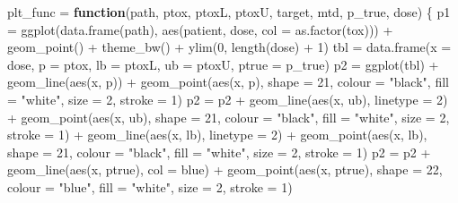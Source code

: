 \documentclass[
]{article}
\newenvironment{Shaded}{\begin{snugshade}}{\end{snugshade}}
\newcommand{\AttributeTok}[1]{\textcolor[rgb]{0.77,0.63,0.00}{#1}}
\newcommand{\ControlFlowTok}[1]{\textcolor[rgb]{0.13,0.29,0.53}{\textbf{#1}}}
\newcommand{\DecValTok}[1]{\textcolor[rgb]{0.00,0.00,0.81}{#1}}
\newcommand{\FunctionTok}[1]{\textcolor[rgb]{0.00,0.00,0.00}{#1}}
\newcommand{\NormalTok}[1]{#1}
\newcommand{\OtherTok}[1]{\textcolor[rgb]{0.56,0.35,0.01}{#1}}
\newcommand{\SpecialCharTok}[1]{\textcolor[rgb]{0.00,0.00,0.00}{#1}}
\newcommand{\StringTok}[1]{\textcolor[rgb]{0.31,0.60,0.02}{#1}}
\begin{document}
\begin{Shaded}
\begin{Highlighting}[]
\NormalTok{plt\_func }\OtherTok{=} \ControlFlowTok{function}\NormalTok{(path, ptox, ptoxL, ptoxU, target, mtd, p\_true, dose) \{}
\NormalTok{p1 }\OtherTok{=} \FunctionTok{ggplot}\NormalTok{(}\FunctionTok{data.frame}\NormalTok{(path), }\FunctionTok{aes}\NormalTok{(patient, dose, }\AttributeTok{col =} \FunctionTok{as.factor}\NormalTok{(tox))) }\SpecialCharTok{+} \FunctionTok{geom\_point}\NormalTok{() }\SpecialCharTok{+} \FunctionTok{theme\_bw}\NormalTok{() }\SpecialCharTok{+} \FunctionTok{ylim}\NormalTok{(}\DecValTok{0}\NormalTok{, }\FunctionTok{length}\NormalTok{(dose) }\SpecialCharTok{+} \DecValTok{1}\NormalTok{) }
\NormalTok{tbl }\OtherTok{=} \FunctionTok{data.frame}\NormalTok{(}\AttributeTok{x =}\NormalTok{ dose, }\AttributeTok{p =}\NormalTok{ ptox, }\AttributeTok{lb =}\NormalTok{ ptoxL, }\AttributeTok{ub =}\NormalTok{ ptoxU, }\AttributeTok{ptrue =}\NormalTok{ p\_true)}
\NormalTok{p2 }\OtherTok{=} \FunctionTok{ggplot}\NormalTok{(tbl) }\SpecialCharTok{+} \FunctionTok{geom\_line}\NormalTok{(}\FunctionTok{aes}\NormalTok{(x, p)) }\SpecialCharTok{+} \FunctionTok{geom\_point}\NormalTok{(}\FunctionTok{aes}\NormalTok{(x, p), }\AttributeTok{shape =} \DecValTok{21}\NormalTok{, }\AttributeTok{colour =} \StringTok{"black"}\NormalTok{, }\AttributeTok{fill =} \StringTok{"white"}\NormalTok{, }\AttributeTok{size =} \DecValTok{2}\NormalTok{, }\AttributeTok{stroke =} \DecValTok{1}\NormalTok{) }
\NormalTok{p2 }\OtherTok{=}\NormalTok{ p2 }\SpecialCharTok{+} \FunctionTok{geom\_line}\NormalTok{(}\FunctionTok{aes}\NormalTok{(x, ub), }\AttributeTok{linetype =} \DecValTok{2}\NormalTok{) }\SpecialCharTok{+} \FunctionTok{geom\_point}\NormalTok{(}\FunctionTok{aes}\NormalTok{(x, ub), }\AttributeTok{shape =} \DecValTok{21}\NormalTok{, }\AttributeTok{colour =} \StringTok{"black"}\NormalTok{, }\AttributeTok{fill =} \StringTok{"white"}\NormalTok{, }\AttributeTok{size =} \DecValTok{2}\NormalTok{, }\AttributeTok{stroke =} \DecValTok{1}\NormalTok{) }\SpecialCharTok{+} \FunctionTok{geom\_line}\NormalTok{(}\FunctionTok{aes}\NormalTok{(x, lb), }\AttributeTok{linetype =} \DecValTok{2}\NormalTok{) }\SpecialCharTok{+} \FunctionTok{geom\_point}\NormalTok{(}\FunctionTok{aes}\NormalTok{(x, lb), }\AttributeTok{shape =} \DecValTok{21}\NormalTok{, }\AttributeTok{colour =} \StringTok{"black"}\NormalTok{, }\AttributeTok{fill =} \StringTok{"white"}\NormalTok{, }\AttributeTok{size =} \DecValTok{2}\NormalTok{, }\AttributeTok{stroke =} \DecValTok{1}\NormalTok{) }
\NormalTok{p2 }\OtherTok{=}\NormalTok{ p2 }\SpecialCharTok{+} \FunctionTok{geom\_line}\NormalTok{(}\FunctionTok{aes}\NormalTok{(x, ptrue), }\AttributeTok{col =} \StringTok{\textquotesingle{}blue\textquotesingle{}}\NormalTok{) }\SpecialCharTok{+} \FunctionTok{geom\_point}\NormalTok{(}\FunctionTok{aes}\NormalTok{(x, ptrue), }\AttributeTok{shape =} \DecValTok{22}\NormalTok{, }\AttributeTok{colour =} \StringTok{"blue"}\NormalTok{, }\AttributeTok{fill =} \StringTok{"white"}\NormalTok{, }\AttributeTok{size =} \DecValTok{2}\NormalTok{, }\AttributeTok{stroke =} \DecValTok{1}\NormalTok{) }

\end{Highlighting}
\end{Shaded}
\end{document}

